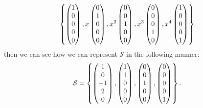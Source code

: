 \[
    \left\{
        \begin{pmatrix}
            1 \\ 0 \\ 0 \\ 0 \\ 0
        \end{pmatrix},
        x\begin{pmatrix}
            0 \\ 1 \\ 0 \\ 0 \\ 0
        \end{pmatrix},
        x^2\begin{pmatrix}
            0 \\ 0 \\ 1 \\ 0 \\ 0
        \end{pmatrix},
        x^3\begin{pmatrix}
            0 \\ 0 \\ 0 \\ 1 \\ 0
        \end{pmatrix},
        x^4\begin{pmatrix}
            1 \\ 0 \\ 0 \\ 0 \\ 1
        \end{pmatrix}
     \right\}
\]
then we can see how we can represent $\mathcal{S}$ in the following manner:
\[
    \mathcal{S} = \left\{
        \begin{pmatrix}
            1 \\ 0 \\ -1 \\ 2 \\ 0
        \end{pmatrix},
        \begin{pmatrix}
            1 \\ 1 \\ 0 \\ 0 \\ 0        
        \end{pmatrix},
        \begin{pmatrix}
            0 \\ 0 \\ 1 \\ 0 \\ 0
        \end{pmatrix},
        \begin{pmatrix}
            0 \\ 0 \\ 0 \\ 0 \\ 1
        \end{pmatrix}
     \right\}.
\]

